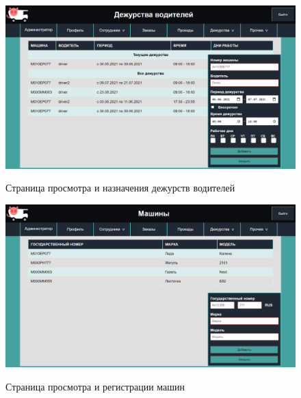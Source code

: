 \begin{figure}[h!] \label{driver_duty_sc}
	\begin{center}
		{\includegraphics[scale=0.43, angle=0]{sc/driver_duty}}
		\caption{Страница просмотра и назначения дежурств водителей}
	\end{center}
\end{figure}

\begin{figure}[h!] \label{trucks_sc}
	\begin{center}
		{\includegraphics[scale=0.43, angle=0]{sc/trucks}}
		\caption{Страница просмотра и регистрации машин}
	\end{center}
\end{figure}

